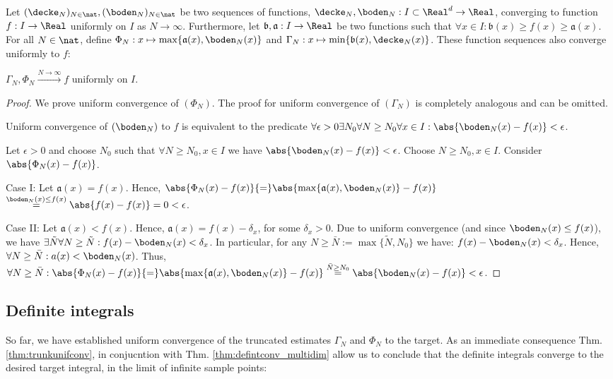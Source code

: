 \begin{thm}\label{thm:trunkunifconv}
Let $(\decke_N)_{N \in \nat}, (\boden_N)_{N \in \nat}$ be two sequences of functions, $\decke_N,\boden_N: I \subset \Real^d \to \Real$, converging to function $f: I \to \Real$ uniformly on $I$ as $N \to \infty$.
Furthermore, let $\mathfrak b, \mathfrak a : I \to \Real$ be two functions such that $\forall x \in I: 
\mathfrak b(x) \geq f(x) \geq \mathfrak a(x)$. For all $N \in \nat$, define $\Phi_N: x \mapsto \max\{\mathfrak a(x),\boden_N(x) \}$ and $\Gamma_N: x \mapsto \min\{\mathfrak b(x),\decke_N(x) \}$.
These function sequences also converge uniformly to $f$: 

$\Gamma_N, \Phi_N \stackrel{N \to \infty}{\longrightarrow} f$ uniformly on $I$.
\begin{proof}
We prove uniform convergence of $(\Phi_N)$. The proof for uniform convergence of $(\Gamma_N)$ is completely analogous and can be omitted.


Uniform convergence of $(\boden_N)$ to $f$  is equivalent to the predicate $\forall \epsilon >0 \exists N_0 \forall N \geq N_0\forall x \in I: \abs{\boden_N(x) - f(x)} < \epsilon$. 

Let $\epsilon > 0$ and choose $N_0$ such that $\forall N \geq N_0, x \in I$ we have 
$\abs{\boden_N(x) - f(x)} < \epsilon$. Choose $N \geq N_0, x\in I$.
Consider $\abs{\Phi_N(x) - f(x)}$. 

Case I: Let $\mathfrak a(x) = f(x)$. Hence, $\abs{\Phi_N(x) - f(x)}
{=} \abs{\max\{\mathfrak a(x),\boden_N(x) \} - f(x)}$
$\stackrel{\boden_N(x) \leq f(x)}{=} \abs{f(x) - f(x)} = 0 < \epsilon$.

Case II: Let $\mathfrak a(x) < f(x)$. Hence, $\mathfrak a(x) = f(x) - \delta_x$, for some $\delta_x >0$.
Due to uniform convergence (and since $\boden_N(x) \leq f(x)$), we have $\exists \tilde N \forall N \geq \tilde N: f(x) - \boden_N(x) < \delta_x$. In particular, for any $N \geq \bar N := \max\{\tilde N, N_0\}$ we have:  $f(x) - \boden_N(x) < \delta_x$. Hence, $\forall N\geq \bar N: a(x) < \boden_N(x)$.
Thus, $\forall N\geq \bar N:  \abs{\Phi_N(x) - f(x)}
{=} \abs{\max\{\mathfrak a(x),\boden_N(x) \} - f(x)}
\stackrel{\bar N \geq N_0}{=} \abs{\boden_N(x) - f(x)} < \epsilon
$.
\end{proof}


\end{thm}
\subsection{Definite integrals}
So far, we have established uniform convergence of the truncated estimates $\Gamma_N$ and $\Phi_N$ to the target. As an immediate consequence Thm. \ref{thm:trunkunifconv}, in conjucntion with Thm. \ref{thm:defintconv_multidim} allow us to conclude that the definite integrals converge to the desired target integral, in the limit of infinite sample points:


